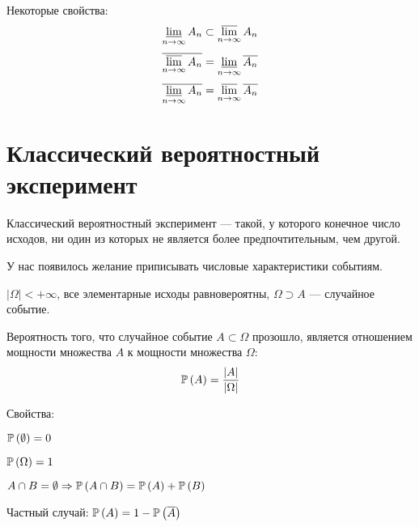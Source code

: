 Некоторые свойства:
$$\varliminf_{n \to \infty} A_n \subset \varlimsup_{n \to \infty} A_n $$
$$\overline{\varlimsup_{n \to \infty} A_n}
= \varliminf_{n \to \infty} \overline{A_n}$$
$$\overline{\varliminf_{n \to \infty} A_n}
= \varlimsup_{n \to \infty} \overline{A_n} $$

\section{Классический вероятностный эксперимент}
\begin{definition}
Классический вероятностный эксперимент --- такой, у которого
конечное число исходов,
ни один из которых не является более предпочтительным, чем другой.
\end{definition}

У нас появилось желание приписывать числовые характеристики событиям.

$\left|\Omega\right| < +\infty$,
все элементарные исходы равновероятны,
$\Omega \supset A$ --- случайное событие.

\begin{definition}[Вероятность]
Вероятность того, что случайное событие $A\subset\Omega$ прозошло,
является отношением мощности множества $A$ к мощности множества $\Omega$:
$$\mathbb{P}\left( A \right)=\frac{\left|A\right|}{\left|\Omega\right|}$$

Свойства:

$\mathbb{P}\left( \emptyset \right)=0$

$\mathbb{P}\left( \Omega \right)=1$

$A\cap B=\emptyset \Rightarrow \mathbb{P}\left( A\cap B \right)
=\mathbb{P}\left( A \right)+\mathbb{P}\left( B \right)$

Частный случай:
$\mathbb{P}\left( A \right)=1-\mathbb{P}\left( \overline{A} \right)$
\end{definition}

